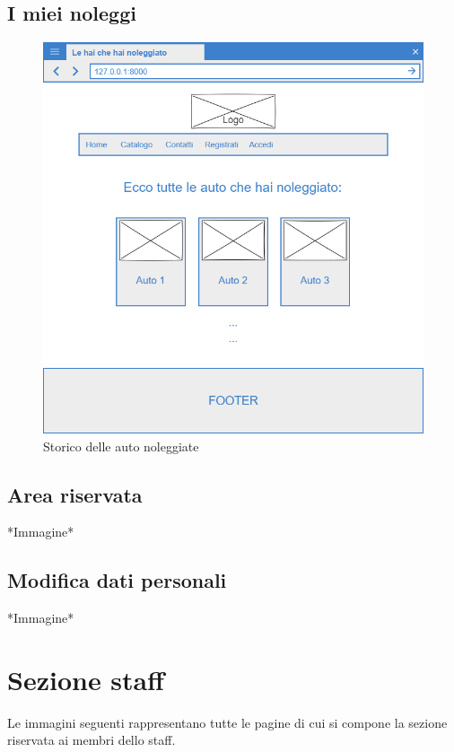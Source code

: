 \documentclass[12pt,a4paperS]{report}
\begin{document}
\begin{normalsize}
			\subsection{I miei noleggi}
				\begin{figure}[H]
					\centering
					\includegraphics[width=1\textwidth, height=1\textheight, keepaspectratio]{Mockup/Storico_noleggi.png}
					\caption{Storico delle auto noleggiate}
				\end{figure}
			
			\subsection{Area riservata}
				*Immagine*
			
			\subsection{Modifica dati personali}
				*Immagine*
				
		\section{Sezione staff}
			Le immagini seguenti rappresentano tutte le pagine di cui si compone la sezione riservata ai membri dello staff.
			

\end{normalsize}
\end{document}
